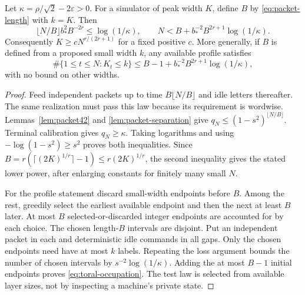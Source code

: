 \begin{proposition}\label{prop:toral-lower}
Let $\kappa=\rho/\sqrt2-2\varepsilon>0$. For a simulator of peak width $K$, define $B$ by \eqref{eq:packet-length} with $k=K$. Then
\begin{equation}\label{eq:toral-finite}
 \lfloor N/B\rfloor b_*^2 B^{-2r}\le\log(1/\kappa),\qquad
 N<B+b_*^{-2}B^{2r+1}\log(1/\kappa).
\end{equation}
Consequently $K\ge cN^{r/(2r+1)}$ for a fixed positive $c$.
More generally, if $B$ is defined from a proposed small width $k$, any available profile satisfies
\begin{equation}\label{eq:toral-occupation}
 \#\{1\le t\le N:K_t\le k\}
 \le B-1+b_*^{-2}B^{2r+1}\log(1/\kappa),
\end{equation}
with no bound on other widths.
\end{proposition}
\begin{proof}
Feed independent packets up to time $B\lfloor N/B\rfloor$ and idle letters thereafter. The same realization must pass this law because its requirement is wordwise. Lemmas~\ref{lem:packet42} and \ref{lem:packet-separation} give $q_N\le(1-s^2)^{\lfloor N/B\rfloor}$. Terminal calibration gives $q_N\ge\kappa$. Taking logarithms and using $-\log(1-s^2)\ge s^2$ proves both inequalities. Since
$B=r(\lceil(2K)^{1/r}\rceil-1)\le r(2K)^{1/r}$,
the second inequality gives the stated lower power, after enlarging constants for finitely many small $N$.

For the profile statement discard small-width endpoints before $B$. Among the rest, greedily select the earliest available endpoint and then the next at least $B$ later. At most $B$ selected-or-discarded integer endpoints are accounted for by each choice. The chosen length-$B$ intervals are disjoint. Put an independent packet in each and deterministic idle commands in all gaps. Only the chosen endpoints need have at most $k$ labels. Repeating the loss argument bounds the number of chosen intervals by $s^{-2}\log(1/\kappa)$. Adding the at most $B-1$ initial endpoints proves \eqref{eq:toral-occupation}. The test law is selected from available layer sizes, not by inspecting a machine's private state.
\end{proof}

